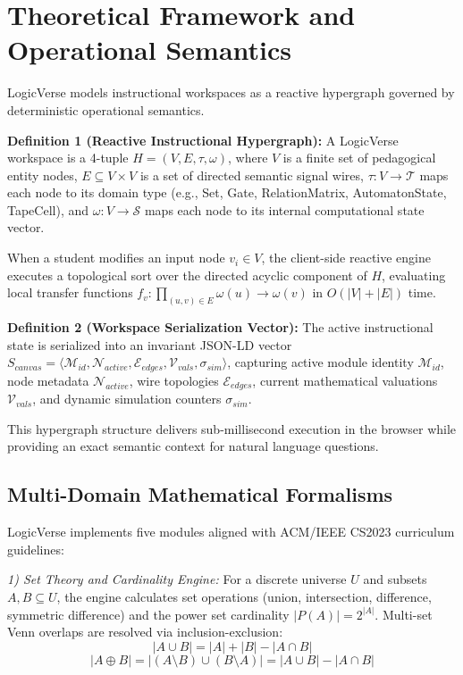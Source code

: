 \documentclass[conference]{IEEEtran}
\begin{document}
\section{Theoretical Framework and Operational Semantics}
LogicVerse models instructional workspaces as a reactive hypergraph governed by deterministic operational semantics.

\textbf{Definition 1 (Reactive Instructional Hypergraph):} A LogicVerse workspace is a 4-tuple $H = (V, E, \tau, \omega)$, where $V$ is a finite set of pedagogical entity nodes, $E \subseteq V \times V$ is a set of directed semantic signal wires, $\tau: V \to \mathcal{T}$ maps each node to its domain type (e.g., Set, Gate, RelationMatrix, AutomatonState, TapeCell), and $\omega: V \to \mathcal{S}$ maps each node to its internal computational state vector.

When a student modifies an input node $v_i \in V$, the client-side reactive engine executes a topological sort over the directed acyclic component of $H$, evaluating local transfer functions $f_v: \prod_{(u,v)\in E} \omega(u) \to \omega(v)$ in $O(|V| + |E|)$ time.

\textbf{Definition 2 (Workspace Serialization Vector):} The active instructional state is serialized into an invariant JSON-LD vector $S_{canvas} = \langle \mathcal{M}_{id}, \mathcal{N}_{active}, \mathcal{E}_{edges}, \mathcal{V}_{vals}, \sigma_{sim} \rangle$, capturing active module identity $\mathcal{M}_{id}$, node metadata $\mathcal{N}_{active}$, wire topologies $\mathcal{E}_{edges}$, current mathematical valuations $\mathcal{V}_{vals}$, and dynamic simulation counters $\sigma_{sim}$.

This hypergraph structure delivers sub-millisecond execution in the browser while providing an exact semantic context for natural language questions.

\subsection{Multi-Domain Mathematical Formalisms}
LogicVerse implements five modules aligned with ACM/IEEE CS2023 curriculum guidelines:

\textit{1) Set Theory and Cardinality Engine:} For a discrete universe $U$ and subsets $A, B \subseteq U$, the engine calculates set operations (union, intersection, difference, symmetric difference) and the power set cardinality $|P(A)| = 2^{|A|}$. Multi-set Venn overlaps are resolved via inclusion-exclusion:
\begin{equation}
|A \cup B| = |A| + |B| - |A \cap B|
\end{equation}
\begin{equation}
|A \oplus B| = |(A \setminus B) \cup (B \setminus A)| = |A \cup B| - |A \cap B|
\end{equation}
\end{document}
